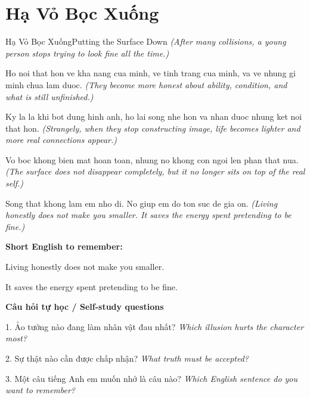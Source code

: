 \section{Hạ Vỏ Bọc Xuống}
\begin{truyen}{Hạ Vỏ Bọc Xuống}{Putting the Surface Down}
\textit{(After many collisions, a young person stops trying to look fine all the time.)}

Ho noi that hon ve kha nang cua minh, ve tinh trang cua minh, va ve nhung gi minh chua lam duoc.
\textit{(They become more honest about ability, condition, and what is still unfinished.)}

Ky la la khi bot dung hinh anh, ho lai song nhe hon va nhan duoc nhung ket noi that hon.
\textit{(Strangely, when they stop constructing image, life becomes lighter and more real connections appear.)}

Vo boc khong bien mat hoan toan, nhung no khong con ngoi len phan that nua.
\textit{(The surface does not disappear completely, but it no longer sits on top of the real self.)}

\end{truyen}

\begin{baihoc}
Song that khong lam em nho di. No giup em do ton suc de gia on.
\textit{(Living honestly does not make you smaller. It saves the energy spent pretending to be fine.)}
\end{baihoc}

\begin{ghinhoanh}
\textbf{Short English to remember:}

Living honestly does not make you smaller.

It saves the energy spent pretending to be fine.

\end{ghinhoanh}

\begin{tuhocnhanh}
\textbf{Câu hỏi tự học / Self-study questions}

1. Ảo tưởng nào đang làm nhân vật đau nhất? \textit{Which illusion hurts the character most?}

2. Sự thật nào cần được chấp nhận? \textit{What truth must be accepted?}

3. Một câu tiếng Anh em muốn nhớ là câu nào? \textit{Which English sentence do you want to remember?}
\end{tuhocnhanh}
